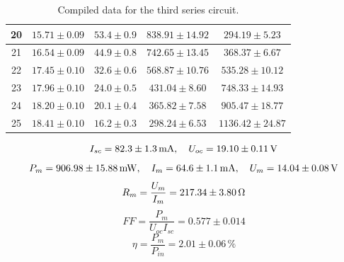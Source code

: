 \begin{table}[!h]
\begin{center}
\begin{tabular}{|c|c|c|c|c|}
\hline
20	&	$15.71 \pm 0.09$	&	$53.4 \pm 0.9$	&	$838.91 \pm 14.92$	&	$294.19 \pm 5.23$	\\
\hline
21	&	$16.54 \pm 0.09$	&	$44.9 \pm 0.8$	&	$742.65 \pm 13.45$	&	$368.37 \pm 6.67$	\\
\hline
22	&	$17.45 \pm 0.10$	&	$32.6 \pm 0.6$	&	$568.87 \pm 10.76$	&	$535.28 \pm 10.12$	\\
\hline
23	&	$17.96 \pm 0.10$	&	$24.0 \pm 0.5$	&	$431.04 \pm 8.60$	&	$748.33 \pm 14.93$	\\
\hline
24	&	$18.20 \pm 0.10$	&	$20.1 \pm 0.4$	&	$365.82 \pm 7.58$	&	$905.47 \pm 18.77$	\\
\hline
25	&	$18.41 \pm 0.10$	&	$16.2 \pm 0.3$	&	$298.24 \pm 6.53$	&	$1136.42 \pm 24.87$	\\
\hline
\end{tabular}
\caption{Compiled data for the third series circuit.}
\label{tab-com-3}
\end{center}
\end{table}

$$I_{sc}=82.3\pm1.3\,{\rm mA},\quad U_{oc}=19.10\pm0.11\,{\rm V}$$
$$P_m=906.98\pm15.88\,{\rm mW},\quad I_m=64.6\pm1.1\,{\rm mA},\quad U_m=14.04\pm0.08\,{\rm V}$$
$$R_m=\frac{U_m}{I_m}=217.34\pm3.80\,{\rm \Omega}$$
$$FF=\frac{P_m}{U_{oc}I_{sc}}=0.577\pm0.014$$
$$\eta=\frac{P_m}{P_{in}}=2.01\pm0.06\,\%$$
$$$$

